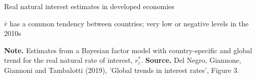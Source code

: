 \documentclass{beamer}
\newcommand{\tb}[1]{{\color{blue}{\textbf{#1}}}}
\newenvironment{mytemize}
{\vfill\itemize[nolistsep,itemsep=\fill,label=\color{blue}{$\triangleright$}]}
  {\enditemize}
\begin{document}
\begin{frame}{Real natural interest estimates in developed economies}

\begin{mytemize}
\item $\bar r$ has a common tendency between countries; very low or negative levels in the 2010s 
\end{mytemize}
\begin{center}

\vspace{-2mm}
\begin{figure}[h!]
	
\end{figure}

\begin{minipage}{1.0\columnwidth}
\tiny	
\textbf{Note.} Estimates from a Bayesian factor model with country-specific and global trend for the real natural rate of interest, $r^*_i$.
\textbf{Source.} Del Negro, Giannone, Giannoni and Tambalotti (2019), 'Global trends in interest rates', Figure 3.\\
\end{minipage}
\end{center}

\end{frame}
\end{document}
